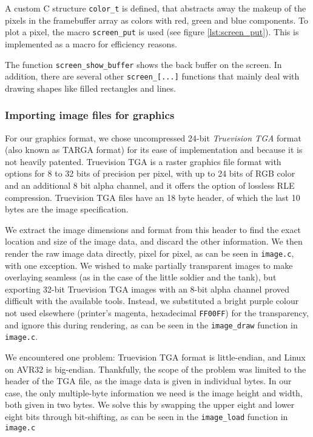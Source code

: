A custom C structure \texttt{color\_t} is defined, that abstracts away
the makeup of the pixels in the framebuffer array as colors with red,
green and blue components. To plot a pixel, the macro
\texttt{screen\_put} is used (see figure \ref{lst:screen_put}). This is
implemented as a macro for efficiency reasons.



The function \texttt{screen\_show\_buffer} shows the back buffer on the
screen. In addition, there are several other \texttt{screen\_[...]}
functions that mainly deal with drawing shapes like filled rectangles
and lines.



\subsubsection{Importing image files for graphics}

For our graphics format, we chose uncompressed 24-bit \emph{Truevision
TGA} format (also known as TARGA format) for its ease of implementation
and because it is not heavily patented. Truevision TGA is a raster
graphics file format with options for 8 to 32 bits of precision per
pixel, with up to 24 bits of RGB color and an additional 8 bit alpha
channel, and it offers the option of lossless RLE compression.
Truevision TGA files have an 18 byte header, of which the last 10 bytes
are the image specification. \cite{tga}

We extract the image dimensions and format from this header to find the
exact location and size of the image data, and discard the other
information. We then render the raw image data directly, pixel for
pixel, as can be seen in \texttt{image.c}, with one exception. We wished
to make partially transparent images to make overlaying seamless (as in
the case of the little soldier and the tank), but exporting 32-bit
Truevision TGA images with an 8-bit alpha channel proved difficult with
the available tools. Instead, we substituted a bright purple colour not
used elsewhere (printer's magenta, hexadecimal \texttt{FF00FF}) for the
transparency, and ignore this during rendering, as can be seen in the
\texttt{image\_draw} function in \texttt{image.c}.

We encountered one problem: Truevision TGA format is little-endian, and
Linux on AVR32 is big-endian. Thankfully, the scope of the problem was
limited to the header of the TGA file, as the image data is given in
individual bytes. In our case, the only multiple-byte information we
need is the image height and width, both given in two bytes. We solve
this by swapping the upper eight and lower eight bits through
bit-shifting, as can be seen in the \texttt{image\_load} function in
\texttt{image.c}

